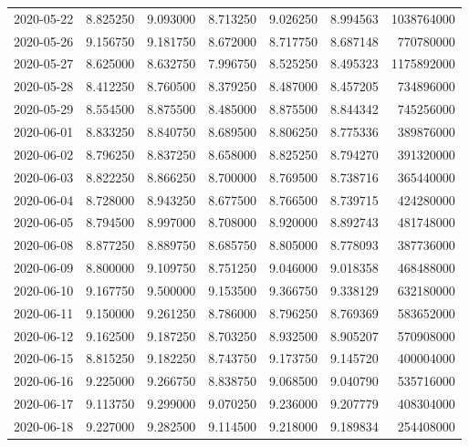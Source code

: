 \begin{tabular}{lrrrrrr}
2020-05-22 &    8.825250 &    9.093000 &    8.713250 &    9.026250 &    8.994563 &  1038764000 \\
2020-05-26 &    9.156750 &    9.181750 &    8.672000 &    8.717750 &    8.687148 &   770780000 \\
2020-05-27 &    8.625000 &    8.632750 &    7.996750 &    8.525250 &    8.495323 &  1175892000 \\
2020-05-28 &    8.412250 &    8.760500 &    8.379250 &    8.487000 &    8.457205 &   734896000 \\
2020-05-29 &    8.554500 &    8.875500 &    8.485000 &    8.875500 &    8.844342 &   745256000 \\
2020-06-01 &    8.833250 &    8.840750 &    8.689500 &    8.806250 &    8.775336 &   389876000 \\
2020-06-02 &    8.796250 &    8.837250 &    8.658000 &    8.825250 &    8.794270 &   391320000 \\
2020-06-03 &    8.822250 &    8.866250 &    8.700000 &    8.769500 &    8.738716 &   365440000 \\
2020-06-04 &    8.728000 &    8.943250 &    8.677500 &    8.766500 &    8.739715 &   424280000 \\
2020-06-05 &    8.794500 &    8.997000 &    8.708000 &    8.920000 &    8.892743 &   481748000 \\
2020-06-08 &    8.877250 &    8.889750 &    8.685750 &    8.805000 &    8.778093 &   387736000 \\
2020-06-09 &    8.800000 &    9.109750 &    8.751250 &    9.046000 &    9.018358 &   468488000 \\
2020-06-10 &    9.167750 &    9.500000 &    9.153500 &    9.366750 &    9.338129 &   632180000 \\
2020-06-11 &    9.150000 &    9.261250 &    8.786000 &    8.796250 &    8.769369 &   583652000 \\
2020-06-12 &    9.162500 &    9.187250 &    8.703250 &    8.932500 &    8.905207 &   570908000 \\
2020-06-15 &    8.815250 &    9.182250 &    8.743750 &    9.173750 &    9.145720 &   400004000 \\
2020-06-16 &    9.225000 &    9.266750 &    8.838750 &    9.068500 &    9.040790 &   535716000 \\
2020-06-17 &    9.113750 &    9.299000 &    9.070250 &    9.236000 &    9.207779 &   408304000 \\
2020-06-18 &    9.227000 &    9.282500 &    9.114500 &    9.218000 &    9.189834 &   254408000 \\

\end{tabular}
